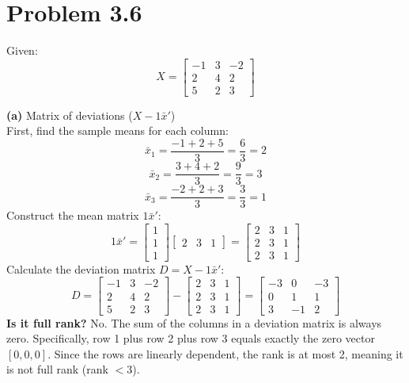 \documentclass{article}
\begin{document}
\hrulefill

\section*{Problem 3.6}
Given:
\[
X = \begin{bmatrix} -1 & 3 & -2 \\ 2 & 4 & 2 \\ 5 & 2 & 3 \end{bmatrix}
\]

\noindent \textbf{(a)} Matrix of deviations ($X - 1\bar{x}'$) \\
First, find the sample means for each column:
\[
\bar{x}_1 = \frac{-1 + 2 + 5}{3} = \frac{6}{3} = 2
\]
\[
\bar{x}_2 = \frac{3 + 4 + 2}{3} = \frac{9}{3} = 3
\]
\[
\bar{x}_3 = \frac{-2 + 2 + 3}{3} = \frac{3}{3} = 1
\]
Construct the mean matrix $1\bar{x}'$:
\[
1\bar{x}' = \begin{bmatrix} 1 \\ 1 \\ 1 \end{bmatrix} \begin{bmatrix} 2 & 3 & 1 \end{bmatrix} = \begin{bmatrix} 2 & 3 & 1 \\ 2 & 3 & 1 \\ 2 & 3 & 1 \end{bmatrix}
\]
Calculate the deviation matrix $D = X - 1\bar{x}'$:
\[
D = \begin{bmatrix} -1 & 3 & -2 \\ 2 & 4 & 2 \\ 5 & 2 & 3 \end{bmatrix} - \begin{bmatrix} 2 & 3 & 1 \\ 2 & 3 & 1 \\ 2 & 3 & 1 \end{bmatrix} = \begin{bmatrix} -3 & 0 & -3 \\ 0 & 1 & 1 \\ 3 & -1 & 2 \end{bmatrix}
\]
\textbf{Is it full rank?} No. The sum of the columns in a deviation matrix is always zero. Specifically, row 1 plus row 2 plus row 3 equals exactly the zero vector $[0, 0, 0]$. Since the rows are linearly dependent, the rank is at most 2, meaning it is not full rank (rank $< 3$).
\end{document}
